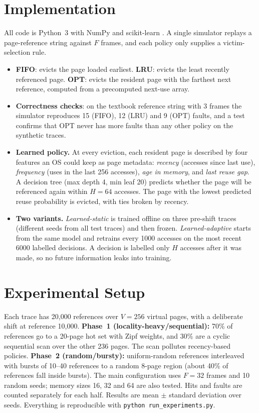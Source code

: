 \documentclass[10pt,a4paper]{article}
\begin{document}
\section{Implementation}
All code is Python~3 with NumPy \cite{numpy} and scikit-learn \cite{sklearn}. A single simulator replays a page-reference string against $F$ frames, and each policy only supplies a victim-selection rule.
\begin{itemize}\setlength{\itemsep}{0pt}
\item \textbf{FIFO}: evicts the page loaded earliest. \textbf{LRU}: evicts the least recently referenced page. \textbf{OPT}: evicts the resident page with the farthest next reference, computed from a precomputed next-use array.
\item \textbf{Correctness checks}: on the textbook reference string with 3 frames \cite{silberschatz} the simulator reproduces 15 (FIFO), 12 (LRU) and 9 (OPT) faults, and a test confirms that OPT never has more faults than any other policy on the synthetic traces.
\item \textbf{Learned policy.} At every eviction, each resident page is described by four features an OS could keep as page metadata: \emph{recency} (accesses since last use), \emph{frequency} (uses in the last 256 accesses), \emph{age in memory}, and \emph{last reuse gap}. A decision tree (max depth 4, min leaf 20) predicts whether the page will be referenced again within $H{=}64$ accesses. The page with the lowest predicted reuse probability is evicted, with ties broken by recency.
\item \textbf{Two variants.} \emph{Learned-static} is trained offline on three pre-shift traces (different seeds from all test traces) and then frozen. \emph{Learned-adaptive} starts from the same model and retrains every 1000 accesses on the most recent 6000 labelled decisions. A decision is labelled only $H$ accesses after it was made, so no future information leaks into training.
\end{itemize}

\section{Experimental Setup}
Each trace has 20{,}000 references over $V{=}256$ virtual pages, with a deliberate shift at reference 10{,}000.
\textbf{Phase~1 (locality-heavy/sequential):} 70\% of references go to a 20-page hot set with Zipf weights, and 30\% are a cyclic sequential scan over the other 236 pages. The scan pollutes recency-based policies.
\textbf{Phase~2 (random/bursty):} uniform-random references interleaved with bursts of 10--40 references to a random 8-page region (about 40\% of references fall inside bursts).
The main configuration uses $F{=}32$ frames and 10 random seeds; memory sizes 16, 32 and 64 are also tested. Hits and faults are counted separately for each half. Results are mean $\pm$ standard deviation over seeds. Everything is reproducible with \texttt{python run\_experiments.py}.
\end{document}
